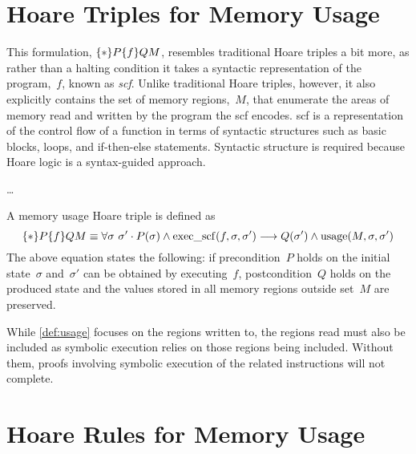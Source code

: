 \section{Hoare Triples for Memory Usage}\label{se:hoare2}
This formulation, $\{*\}P\{f\}{Q}{M}$,
resembles traditional Hoare triples a bit more,%
as rather than a halting condition
it takes a syntactic representation of the program,~$f$, known as \emph{\ac{scf}}.
Unlike traditional Hoare triples, however,
it also explicitly contains the set of memory regions,~$M$,
that enumerate the areas of memory read and written by the program
the \ac{scf} encodes.
\Ac{scf} is a representation of the control flow of a function
in terms of syntactic structures such as basic blocks,
loops, and if-then-else statements.
Syntactic structure is required because Hoare logic is a syntax-guided approach.

\todo\dots

\begin{definition}\label{def:usage}
  A memory usage Hoare triple is defined as
  \begin{equation}
    \{*\}P\{f\}{Q}{M}\equiv
    \forall\sigma~\sigma'\cdot P(\sigma)\wedge\operatorname{exec\_scf}(f,\sigma,\sigma')\longrightarrow
    Q(\sigma')\wedge\operatorname{usage}(M,\sigma,\sigma')
  \end{equation}
  The above equation states the following:
  if precondition~$P$ holds on the initial state~$\sigma$
  and~$\sigma'$ can be obtained by executing~$f$,
  postcondition~$Q$ holds on the produced state
  and the values stored in all memory regions outside set~$M$ are preserved.
\end{definition}
While \cref{def:usage} focuses on the regions written to,
the regions read must also be included as symbolic execution
relies on those regions being included.
Without them, proofs involving symbolic execution
of the related instructions will not complete.


\section{Hoare Rules for Memory Usage}\label{se:hoare_rules}
